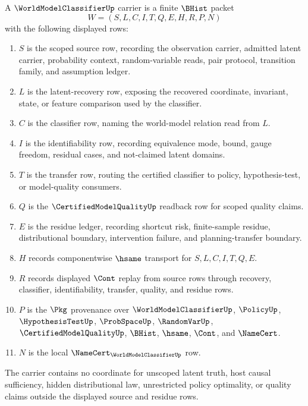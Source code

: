 \begin{definition}
\label{def:world-model-classifier-carrier}
A $\WorldModelClassifierUp$ carrier is a finite $\BHist$ packet
$$
W=(S,L,C,I,T,Q,E,H,R,P,N)
$$
with the following displayed rows:
\begin{enumerate}
\item $S$ is the scoped source row, recording the observation carrier, admitted latent carrier, probability context, random-variable reads, pair protocol, transition family, and assumption ledger.
\item $L$ is the latent-recovery row, exposing the recovered coordinate, invariant, state, or feature comparison used by the classifier.
\item $C$ is the classifier row, naming the world-model relation read from $L$.
\item $I$ is the identifiability row, recording equivalence mode, bound, gauge freedom, residual cases, and not-claimed latent domains.
\item $T$ is the transfer row, routing the certified classifier to policy, hypothesis-test, or model-quality consumers.
\item $Q$ is the $\CertifiedModelQualityUp$ readback row for scoped quality claims.
\item $E$ is the residue ledger, recording shortcut risk, finite-sample residue, distributional boundary, intervention failure, and planning-transfer boundary.
\item $H$ records componentwise $\hsame$ transport for $S,L,C,I,T,Q,E$.
\item $R$ records displayed $\Cont$ replay from source rows through recovery, classifier, identifiability, transfer, quality, and residue rows.
\item $P$ is the $\Pkg$ provenance over $\WorldModelClassifierUp$, $\PolicyUp$, $\HypothesisTestUp$, $\ProbSpaceUp$, $\RandomVarUp$, $\CertifiedModelQualityUp$, $\BHist$, $\hsame$, $\Cont$, and $\NameCert$.
\item $N$ is the local $\NameCert_{\WorldModelClassifierUp}$ row.
\end{enumerate}
The carrier contains no coordinate for unscoped latent truth, host causal sufficiency, hidden distributional law, unrestricted policy optimality, or quality claims outside the displayed source and residue rows.
\end{definition}

